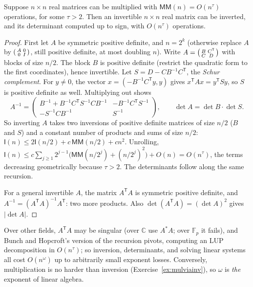 \begin{theorem}\label{thm:inversion}
Suppose $n\times n$ real matrices can be multiplied with $\mathsf{MM}(n)=O(n^\tau)$ operations, for some $\tau>2$. Then an invertible $n\times n$ real matrix can be inverted, and its determinant computed up to sign, with $O(n^\tau)$ operations.
\end{theorem}
\begin{proof}
First let $A$ be symmetric positive definite, and $n=2^k$ (otherwise replace $A$ by $\begin{psmallmatrix}A&0\\0&I\end{psmallmatrix}$, still positive definite, at most doubling $n$). Write
$A=\begin{psmallmatrix}B&C^{\mathsf T}\\C&D\end{psmallmatrix}$ with blocks of size $n/2$. The block $B$ is positive definite (restrict the quadratic form to the first coordinates), hence invertible. Let $S=D-CB^{-1}C^{\mathsf T}$, the \emph{Schur complement}. For $y\ne0$, the vector $x=(-B^{-1}C^{\mathsf T}y,y)$ gives $x^{\mathsf T}Ax=y^{\mathsf T}Sy$, so $S$ is positive definite as well. Multiplying out shows
\[
A^{-1}=\begin{pmatrix}B^{-1}+B^{-1}C^{\mathsf T}S^{-1}CB^{-1}&-B^{-1}C^{\mathsf T}S^{-1}\\-S^{-1}CB^{-1}&S^{-1}\end{pmatrix},\qquad\det A=\det B\cdot\det S.
\]
So inverting $A$ takes two inversions of positive definite matrices of size $n/2$ ($B$ and $S$) and a constant number of products and sums of size $n/2$: $\mathsf I(n)\le2\mathsf I(n/2)+c\,\mathsf{MM}(n/2)+cn^2$. Unrolling, $\mathsf I(n)\le c\sum_{j\ge1}2^{j-1}\bigl(\mathsf{MM}(n/2^j)+(n/2^j)^2\bigr)+O(n)=O(n^\tau)$, the terms decreasing geometrically because $\tau>2$. The determinants follow along the same recursion.

For a general invertible $A$, the matrix $A^{\mathsf T}A$ is symmetric positive definite, and $A^{-1}=(A^{\mathsf T}A)^{-1}A^{\mathsf T}$: two more products. Also $\det(A^{\mathsf T}A)=(\det A)^2$ gives $|\det A|$.
\end{proof}

Over other fields, $A^{\mathsf T}A$ may be singular (over $\mathbb C$ use $A^*A$; over $\mathbb F_p$ it fails), and Bunch and Hopcroft's version of the recursion pivots, computing an LUP decomposition in $O(n^\tau)$; so inversion, determinants, and solving linear systems all cost $O(n^\omega)$ up to arbitrarily small exponent losses. Conversely, multiplication is no harder than inversion (Exercise~\ref{ex:mulviainv}), so $\omega$ is \emph{the} exponent of linear algebra.

